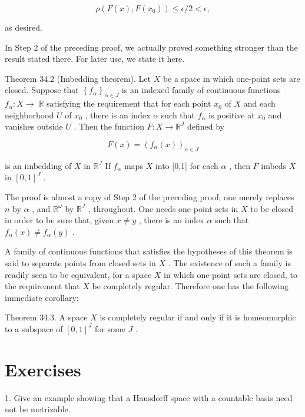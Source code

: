 \documentclass[10pt]{article}
\begin{document}
\[
\rho \left( {F\left( x\right) ,F\left( {x}_{0}\right) }\right)  \leq  \epsilon /2 < \epsilon ,
\]

as desired.

In Step 2 of the preceding proof, we actually proved something stronger than the result stated there. For later use, we state it here.

Theorem 34.2 (Imbedding theorem). Let \(X\) be a space in which one-point sets are closed. Suppose that \({\left\{  {f}_{\alpha }\right\}  }_{\alpha  \in  J}\) is an indexed family of continuous functions \({f}_{\alpha } : X \rightarrow \; \mathbb{R}\) satisfying the requirement that for each point \({x}_{0}\) of \(X\) and each neighborhood \(U\) of \({x}_{0}\) , there is an index \(\alpha\) such that \({f}_{\alpha }\) is positive at \({x}_{0}\) and vanishes outside \(U\) . Then the function \(F : X \rightarrow  {\mathbb{R}}^{J}\) defined by

\[
F\left( x\right)  = {\left( {f}_{\alpha }\left( x\right) \right) }_{\alpha  \in  J}
\]

is an imbedding of \(X\) in \({\mathbb{R}}^{J}\) If \({f}_{\alpha }\) maps \(X\) into [0,1] for each \(\alpha\) , then \(F\) imbeds \(X\) in \({\left\lbrack  0,1\right\rbrack  }^{J}\) .

The proof is almost a copy of Step 2 of the preceding proof; one merely replaces \(n\) by \(\alpha\) , and \({\mathbb{R}}^{\omega }\) by \({\mathbb{R}}^{J}\) , throughout. One needs one-point sets in \(X\) to be closed in order to be sure that, given \(x \neq  y\) , there is an index \(\alpha\) such that \({f}_{\alpha }\left( x\right)  \neq  {f}_{\alpha }\left( y\right)\) .

A family of continuous functions that satisfies the hypotheses of this theorem is said to separate points from closed sets in \(X\) . The existence of such a family is readily seen to be equivalent, for a space \(X\) in which one-point sets are closed, to the requirement that \(X\) be completely regular. Therefore one has the following immediate corollary:

Theorem 34.3. A space \(X\) is completely regular if and only if it is homeomorphic to a subspace of \({\left\lbrack  0,1\right\rbrack  }^{J}\) for some \(J\) .

\section*{Exercises}

1. Give an example showing that a Hausdorff space with a countable basis need not be metrizable.
\end{document}
